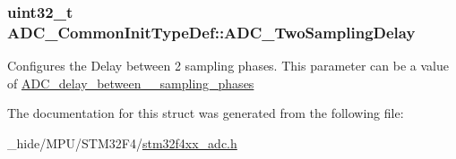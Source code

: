 \subsubsection[{A\+D\+C\+\_\+\+Two\+Sampling\+Delay}]{\setlength{\rightskip}{0pt plus 5cm}uint32\+\_\+t A\+D\+C\+\_\+\+Common\+Init\+Type\+Def\+::\+A\+D\+C\+\_\+\+Two\+Sampling\+Delay}\label{struct_a_d_c___common_init_type_def_a2828abd59ed1777ae66c642d89be410e}
Configures the Delay between 2 sampling phases. This parameter can be a value of \hyperlink{group___a_d_c__delay__between__2__sampling__phases}{A\+D\+C\+\_\+delay\+\_\+between\+\_\+\_\+sampling\+\_\+phases} 

The documentation for this struct was generated from the following file\+:\begin{DoxyCompactItemize}
\item 
\+\_\+hide/\+M\+P\+U/\+S\+T\+M32\+F4/\hyperlink{stm32f4xx__adc_8h}{stm32f4xx\+\_\+adc.\+h}\end{DoxyCompactItemize}
